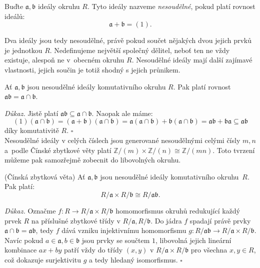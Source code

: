 \documentclass[12pt]{report}
\begin{document}
\begin{definice}
Buďte $\mathfrak{a},\mathfrak{b}$ ideály okruhu $R$. Tyto ideály nazveme \textit{nesoudělné}, pokud platí rovnost ideálů:
\begin{equation*}
\mathfrak{a}+\mathfrak{b} = (1).
\end{equation*}
\end{definice}

Dva ideály jsou tedy nesoudělné, právě pokud součet nějakých dvou jejich prvků je jednotkou $R$. Nedefinujeme největší společný dělitel, neboť ten ne vždy existuje, alespoň ne v~obecném okruhu $R$. Nesoudělné ideály mají další zajímavé vlastnosti, jejich součin je totiž shodný s jejich průnikem.

\begin{lemma}
Ať $\mathfrak{a},\mathfrak{b}$ jsou nesoudělné ideály komutativního okruhu $R$. Pak platí rovnost $\mathfrak{ab} = \mathfrak{a} \cap \mathfrak{b}$.
\end{lemma}
\noindent \textit{Důkaz.} Jistě platí $\mathfrak{ab} \subseteq \mathfrak{a} \cap \mathfrak{b}$. Naopak ale máme:
\begin{equation*}
(1)(\mathfrak{a} \cap \mathfrak{b}) = (\mathfrak{a}+\mathfrak{b}) (\mathfrak{a} \cap \mathfrak{b}) = \mathfrak{a}(\mathfrak{a} \cap \mathfrak{b}) + \mathfrak{b} (\mathfrak{a} \cap \mathfrak{b}) = \mathfrak{a b}+ \mathfrak{ba} \subseteq \mathfrak{ab} 
\end{equation*}
díky komutativitě $R$. \hfill $\square$\\

Nesoudělné ideály v celých číslech jsou generované nesoudělnými celými čísly $m,n$ a~podle Čínské zbytkové věty platí $\mathbb{Z}/(m) \times \mathbb{Z}/(n) \cong \mathbb{Z}/(mn)$. Toto tvrzení můžeme pak samozřejmě zobecnit do libovolných okruhu.

\begin{veta}(Čínská zbytková věta)\label{CRT}
Ať $\mathfrak{a},\mathfrak{b}$ jsou nesoudělné ideály komutativního okruhu~$R$. Pak platí:
\begin{equation*}
R/\mathfrak{a} \times R/\mathfrak{b} \cong R/\mathfrak{ab}.
\end{equation*}
\end{veta} 
\noindent \textit{Důkaz.} Označme $f : R \longrightarrow R/\mathfrak{a} \times R/\mathfrak{b}$ homomorfismus okruhů redukující každý prvek $R$ na příslušné zbytkové třídy v $R/\mathfrak{a},R/\mathfrak{b}$. Do jádra $f$ spadají právě prvky $\mathfrak{a} \cap \mathfrak{b} = \mathfrak{ab}$, tedy $f$ dává vzniku injektivnímu homomorfismu $g : R/\mathfrak{ab} \longrightarrow R/\mathfrak{a} \times R/\mathfrak{b}$. Navíc pokud $a \in \mathfrak{a}, b\in \mathfrak{b}$ jsou prvky se součtem $1$, libovolná jejich lineární kombinace $ax+by$ patří vždy do třídy $(x,y)$ v $R/\mathfrak{a} \times R/\mathfrak{b}$ pro všechna $x,y \in R$, což dokazuje surjektivitu $g$ a tedy hledaný isomorfismus. \hfill $\square$\\
\end{document}
